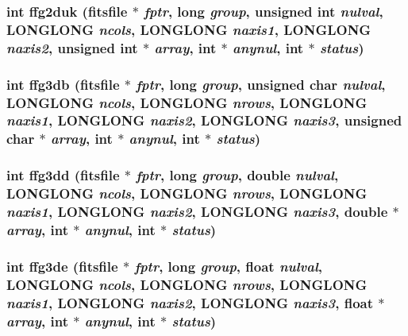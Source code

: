 \subsubsection{\setlength{\rightskip}{0pt plus 5cm}int ffg2duk (\bf{fitsfile} $\ast$ {\em fptr}, long {\em group}, unsigned int {\em nulval}, \bf{LONGLONG} {\em ncols}, \bf{LONGLONG} {\em naxis1}, \bf{LONGLONG} {\em naxis2}, unsigned int $\ast$ {\em array}, int $\ast$ {\em anynul}, int $\ast$ {\em status})}\label{src_2fitsio_8h_c6647602cdca43baba09deb777b5dcd4}


\subsubsection{\setlength{\rightskip}{0pt plus 5cm}int ffg3db (\bf{fitsfile} $\ast$ {\em fptr}, long {\em group}, unsigned char {\em nulval}, \bf{LONGLONG} {\em ncols}, \bf{LONGLONG} {\em nrows}, \bf{LONGLONG} {\em naxis1}, \bf{LONGLONG} {\em naxis2}, \bf{LONGLONG} {\em naxis3}, unsigned char $\ast$ {\em array}, int $\ast$ {\em anynul}, int $\ast$ {\em status})}\label{src_2fitsio_8h_9582d214eee6caff5f012349cd686953}


\subsubsection{\setlength{\rightskip}{0pt plus 5cm}int ffg3dd (\bf{fitsfile} $\ast$ {\em fptr}, long {\em group}, double {\em nulval}, \bf{LONGLONG} {\em ncols}, \bf{LONGLONG} {\em nrows}, \bf{LONGLONG} {\em naxis1}, \bf{LONGLONG} {\em naxis2}, \bf{LONGLONG} {\em naxis3}, double $\ast$ {\em array}, int $\ast$ {\em anynul}, int $\ast$ {\em status})}\label{src_2fitsio_8h_118dc24914a4d05af2d47290a4a608a6}


\subsubsection{\setlength{\rightskip}{0pt plus 5cm}int ffg3de (\bf{fitsfile} $\ast$ {\em fptr}, long {\em group}, float {\em nulval}, \bf{LONGLONG} {\em ncols}, \bf{LONGLONG} {\em nrows}, \bf{LONGLONG} {\em naxis1}, \bf{LONGLONG} {\em naxis2}, \bf{LONGLONG} {\em naxis3}, float $\ast$ {\em array}, int $\ast$ {\em anynul}, int $\ast$ {\em status})}\label{src_2fitsio_8h_5848c6f1a0ec2bdbb3c7cc460438eaf5}


